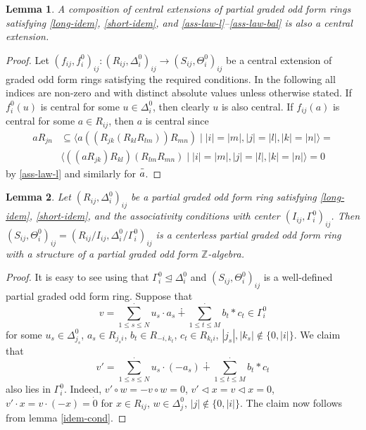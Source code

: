 \documentclass{article}
\newtheorem{lemma}{Lemma}
\theoremstyle{definition}
\newcommand{\leqt}{\trianglelefteq}
\newcommand{\inv}[1]{
    \!\;\overline{
        \!\!\:#1\vphantom !\!\!\:
    }\;\!
}
\begin{document}
\begin{lemma} \label{cext-comp}
    A composition of central extensions of partial graded odd form rings satisfying \ref{long-idem}, \ref{short-idem}, and \ref{ass-law-l}--\ref{ass-law-bal} is also a central extension.
\end{lemma}
\begin{proof}
    Let \(
        (f_{ij}, f^0_i)_{ij}
        \colon (R_{ij}, \Delta^0_i)_{ij}
        \to (S_{ij}, \Theta^0_i)_{ij}
    \) be a central extension of graded odd form rings satisfying the required conditions. In the following all indices are non-zero and with distinct absolute values unless otherwise stated. If \(f^0_i(u)\) is central for some \(u \in \Delta^0_i\), then clearly \(u\) is also central. If \(f_{ij}(a)\) is central for some \(a \in R_{ij}\), then \(a\) is central since
    \begin{align*}
        a R_{jn}
        &\subseteq
        \bigl\langle
            a ((R_{jk} (R_{kl} R_{lm})) R_{mn})
            \mid
            |i| = |m|, |j| = |l|, |k| = |n|
        \bigr\rangle
        =\\
        &\bigl\langle
            ((a R_{jk}) R_{kl}) (R_{lm} R_{mn})
            \mid
            |i| = |m|, |j| = |l|, |k| = |n|
        \bigr\rangle
        = 0
    \end{align*}
    by \ref{ass-law-l} and similarly for \(\inv a\).
\end{proof}

\begin{lemma} \label{centerless}
    Let \(
        (R_{ij}, \Delta^0_i)_{ij}
    \) be a partial graded odd form ring satisfying \ref{long-idem}, \ref{short-idem}, and the associativity conditions with center \(
        (I_{ij}, \Gamma^0_i)_{ij}
    \). Then \(
        (S_{ij}, \Theta^0_i)_{ij}
        =
        (
            R_{ij} / I_{ij},
            \Delta^0_i / \Gamma^0_i
        )_{ij}
    \) is a centerless partial graded odd form ring with a structure of a partial graded odd form \(\mathbb Z\)-algebra.
\end{lemma}
\begin{proof}
    It is easy to see using that \(
        \Gamma^0_i \leqt \Delta^0_i
    \) and \(
        (S_{ij}, \Theta^0_i)_{ij}
    \) is a well-defined partial graded odd form ring. Suppose that \[
        v
        =
        \sum_{1 \leq s \leq N}^\cdot u_s \cdot a_s
        \dotplus \sum_{1 \leq t \leq M}^\cdot
            b_t * c_t
        \in \Gamma^0_i
    \] for some \(u_s \in \Delta^0_{j_s}\), \(a_s \in R_{j_s i}\), \(b_t \in R_{-i, k_t}\), \(c_t \in R_{k_t i}\), \(|j_s|, |k_s| \notin \{0, |i|\}\). We claim that \[
        v'
        =
        \sum_{1 \leq s \leq N}^\cdot u_s \cdot (-a_s)
        \dotplus \sum_{1 \leq t \leq M}^\cdot
            b_t * c_t
    \]
    also lies in \(\Gamma^0_i\). Indeed, \(
        v' \circ w = -v \circ w = 0
    \), \(
        v' \triangleleft x = v \triangleleft x = 0
    \), \(
        v' \cdot x = v \cdot (-x) = \dot 0
    \) for \(x \in R_{ij}\), \(w \in \Delta^0_j\), \(|j| \notin \{0, |i|\}\). The claim now follows from lemma \ref{idem-cond}.
\end{proof}
\end{document}
